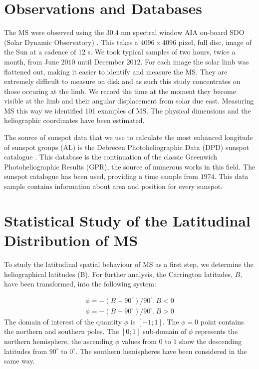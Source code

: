 \section{Observations and Databases}
The MS were observed using the $30.4$ nm spectral window AIA on-board SDO (Solar Dynamic Observatory) \citep{AIAspec}. This takes a $4096 \times 4096$ pixel, full disc, image of the Sun at a cadence of $12$ s. We took typical samples of two hours, twice a month, from June $2010$ until December $2012$. For each image the solar limb was flattened out, making it easier to identify and measure the MS. They are extremely difficult to measure on disk and as such this study concentrates on those occuring at the limb. We record the time at the moment they become visible at the limb and their angular displacement from solar due east. Measuring MS this way we identified 101 examples of MS. The physical dimensions and the heliographic coordinates have been estimated. 

The source of sunspot data that we use to calculate the most enhanced longitude of sunspot groups (AL) is the Debrecen Photoheliographic Data (DPD) sunspot catalogue \citep{DPD}. This database is the continuation of the classic Greenwich Photoheliographic Results (GPR), the source of numerous works in this field. The sunspot catalogue has been used, providing a time sample from $1974$. This data sample contains information about area and position for every sunspot.

\section{Statistical Study of the Latitudinal Distribution of MS}
To study the latitudinal spatial behaviour of MS as a first step, we determine the heliographical latitudes (B). For further analysis, the Carrington latitudes, $B$, have been transformed, into the following system:

\begin{equation}
\begin{split}
\phi=-(B+90^{\circ})/90^{\circ},  B<0 \\
\phi=-(B-90^{\circ})/90^{\circ},  B>0
\end{split}
\end{equation}
\newpage
The domain of interest of the quantity $\phi$ is $[-1;1]$. The $\phi=0$ point contains the northern and southern poles. The $[0;1]$ sub-domain of $\phi$ represents the northern hemisphere, the ascending $\phi$ values from $0$ to $1$ show the descending latitudes from $90^{\circ}$ to $0^{\circ}$. The southern hemispheres have been considered in the same way.


